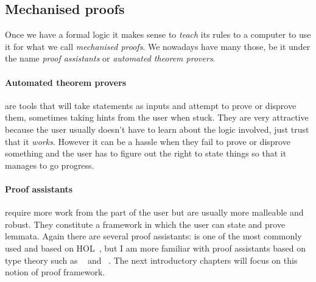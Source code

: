 \subsection{Mechanised proofs}

Once we have a formal logic it makes sense to \emph{teach} its rules to a
computer to use it for what we call \emph{mechanised proofs}.
We nowadays have many those, be it under the name \emph{proof assistants} or
\emph{automated theorem provers}.

\paragraph{Automated theorem provers} are tools that will take statements as
inputs and attempt to prove or disprove them, sometimes taking hints from the
user when stuck.
They are very attractive because the user usually doesn't have to learn about
the logic involved, just trust that it \emph{works}. However it can be a hassle when they fail to prove or disprove
something and the user has to figure out the right to state things so that it
manages to go progress.

\paragraph{Proof assistants} require more work from the part of the user but are
usually more malleable and robust. They constitute a framework in which the user
can state and prove lemmata. Again there are several proof assistants: \IsaHOL
is one of the most commonly used and based on
\acrfull{HOL}~, but I am more  familiar with
proof assistants based on type theory such as \Coq~ and
\Agda~.
The next introductory chapters will focus on this notion of proof framework.